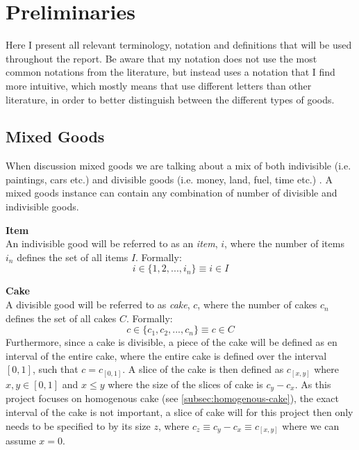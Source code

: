 \section{Preliminaries}\label{sec:preliminaries}

Here I present all relevant terminology, notation and definitions that will be used throughout the report. Be aware that my notation does not use the most common notations from the literature, but instead uses a notation that I find more intuitive, which mostly means that use different letters than other literature, in order to better distinguish between the different types of goods.

\def\sGood{g}
\def\sAllGoods{G}
\def\sNumGoods{m}

\def\sItem{i}
\def\sAllItems{I}
\def\sNumItems{i_n}

\def\sCake{c}
\def\sTheCake{C}
\def\sAllCakes{C}
\def\sNumCakes{c_n}

\def\sAgent{a}
\def\sAllAgents{A}
\def\sNumAgents{n}

\def\sValuation{v}
\def\sAllValuations{V}
\def\sNumValuations{v_n}

\def\sAllocation{\scalebox{1.25}{$\mathpzc{A}$}}
\def\sInstance{\scalebox{1.1}{I}}
\def\sBundle{B}

\def\MMS{\text{MMS}}
\def\halfMMS{\frac{1}{2}\text{MMS}}
\def\PROP{\text{PROP}}
\def\R{\mathbb{R}}


\subsection*{Mixed Goods}
When discussion mixed goods we are talking about a mix of both indivisible (i.e. paintings, cars etc.) and divisible goods (i.e. money, land, fuel, time etc.) . A mixed goods instance can contain any combination of number of divisible and indivisible goods.

\textbf{Item}\\
An indivisible good will be referred to as an \emph{item}, $\sItem$, where the number of items $\sNumItems$ defines the set of all items $\sAllItems$. Formally:
$$\sItem\in\{1,2,...,\sNumItems\}\equiv\sItem\in\sAllItems$$

\textbf{Cake}\\
A divisible good will be referred to as \emph{cake}, $\sCake$, where the number of cakes $\sNumCakes$ defines the set of all cakes $\sAllCakes$. Formally:
$$\sCake\in\{\sCake_1, \sCake_2, ...,\sNumCakes\}\equiv\sCake\in\sAllCakes$$
Furthermore, since a cake is divisible, a piece of the cake will be defined as en interval of the entire cake, where the entire cake is defined over the interval $[0,1]$, such that $\sCake=\sCake_{[0,1]}$.
A slice of the cake is then defined as $\sCake_{[x,y]}$ where $x,y \in [0,1]$ and $x \leq y$ where the size of the slices of cake is $\sCake_y-\sCake_x$. As this project focuses on homogenous cake (see \autoref{subsec:homogenous-cake}), the exact interval of the cake is not important, a slice of cake will for this project then only needs to be specified to by its size $z$, where $\sCake_z\equiv\sCake_y-\sCake_x\equiv\sCake_{[x,y]}$ where we can assume $x=0$.

